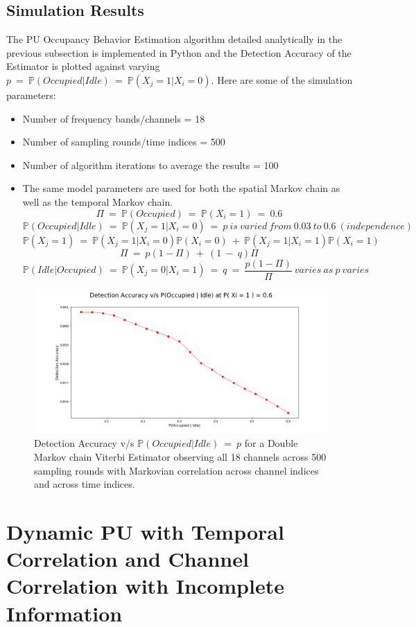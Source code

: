 \documentclass[12pt, draftcls, onecolumn]{IEEEtran}
\begin{document}
\subsection{Simulation Results}
The PU Occupancy Behavior Estimation algorithm detailed analytically in the previous subsection is implemented in Python and the Detection Accuracy of the Estimator is plotted against varying $p\ =\ \mathbb P(Occupied|Idle)\ =\ \mathbb P(X_j=1|X_i=0)$. Here are some of the simulation parameters:
\begin{itemize}
    \item Number of frequency bands/channels = 18
    \item Number of sampling rounds/time indices = 500
    \item Number of algorithm iterations to average the results = 100
    \item The same model parameters are used for both the spatial Markov chain as well as the temporal Markov chain.
    \[\Pi\ =\ \mathbb P(Occupied)\ =\ \mathbb P(X_i=1)\ =\ 0.6\]
    \[\mathbb P(Occupied|Idle)\ =\ \mathbb P(X_j=1|X_i=0)\ =\ p\ is\ varied\ from\ 0.03\ to\ 0.6\ (independence)\]
    \[\mathbb P(X_j=1)\ =\ \mathbb P(X_j=1|X_i=0)\mathbb P(X_i=0)\ +\ \mathbb P(X_j=1|X_i=1)\mathbb P(X_i=1)\]
    \[\Pi\ =\ p(1-\Pi)\ +\ (1\ -\ q)\Pi\]
    \[\mathbb P(Idle|Occupied)\ =\ \mathbb P(X_j=0|X_i=1)\ =\ q\ =\ \frac{p(1-\Pi)}{\Pi}\ varies\ as\ p\ varies\]
\end{itemize}
\begin{figure}[t]
\includegraphics[width=1.0\textwidth]{Detection_Accuracy_vs_p_Iteration_1.png}
\caption{Detection Accuracy v/s $\mathbb P(Occupied|Idle)\ =\ p$ for a Double Markov chain Viterbi Estimator observing all 18 channels across 500 sampling rounds with Markovian correlation across channel indices and across time indices.}
\label{fig:mesh11}
\centering
\end{figure}
\section{Dynamic PU with Temporal Correlation and Channel Correlation with Incomplete Information}
\end{document}
